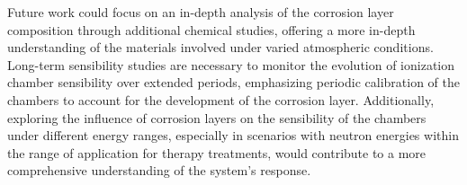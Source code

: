 Future work could focus on an in-depth analysis of the corrosion layer composition through additional chemical studies, offering a more in-depth understanding of the materials involved under varied atmospheric conditions. Long-term sensibility studies are necessary to monitor the evolution of ionization chamber sensibility over extended periods, emphasizing periodic calibration of the chambers to account for the development of the corrosion layer. Additionally, exploring the influence of corrosion layers on the sensibility of the chambers under different energy ranges, especially in scenarios with neutron energies within the range of application for therapy treatments, would contribute to a more comprehensive understanding of the system's response.
